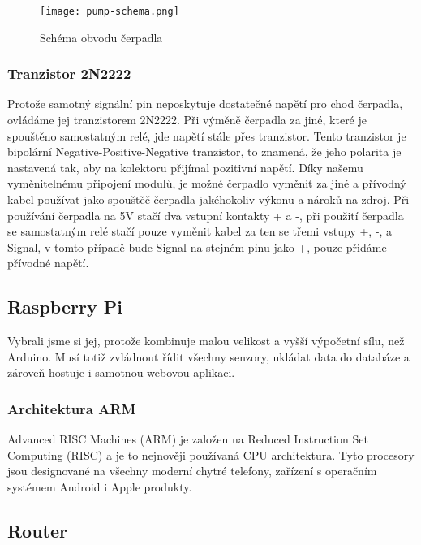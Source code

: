 \documentclass[czech,12pt,a4paper]{article}
\begin{document}
\vspace*{1cm}
\begin{figure}[h]
	\centering
	\texttt{[image: pump-schema.png]}
	\caption{Schéma obvodu čerpadla}
	\label{fig:schema-obvodu-cerpadla}
\end{figure}

\subsubsection{Tranzistor 2N2222}

Protože samotný signální pin neposkytuje dostatečné napětí pro chod čerpadla, ovládáme jej tranzistorem 2N2222. Při výměně čerpadla za jiné, které je spouštěno samostatným relé, jde napětí stále přes tranzistor. Tento tranzistor je bipolární Negative-Positive-Negative tranzistor, to znamená, že jeho polarita je nastavená tak, aby na kolektoru přijímal pozitivní napětí. Díky našemu vyměnitelnému připojení modulů, je možné čerpadlo vyměnit za jiné a přívodný kabel používat jako spouštěč čerpadla jakéhokoliv výkonu a nároků na zdroj. Při používání čerpadla na 5V stačí dva vstupní kontakty + a -, při použití čerpadla se samostatným relé stačí pouze vyměnit kabel za ten se třemi vstupy +, -, a Signal, v tomto případě bude Signal na stejném pinu jako +, pouze přidáme přívodné napětí.

\subsection{Raspberry Pi} \label{secRPi}

Vybrali jsme si jej, protože kombinuje malou velikost a vyšší výpočetní sílu, než Arduino. Musí totiž zvládnout řídit všechny senzory, ukládat data do databáze a zároveň hostuje i samotnou webovou aplikaci.

\subsubsection{Architektura ARM}

Advanced RISC Machines (ARM) je založen na Reduced Instruction Set Computing (RISC) a je to nejnověji používaná CPU architektura. Tyto procesory jsou designované na všechny moderní chytré telefony, zařízení s operačním systémem Android i Apple produkty.

\subsection{Router}
\end{document}

